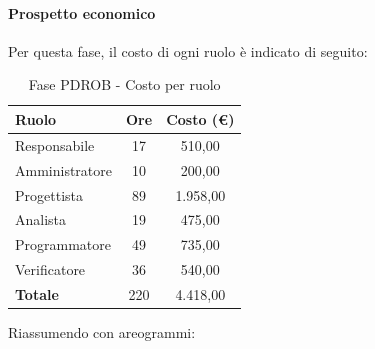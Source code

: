 \documentclass[../PianoProgetto.tex]{subfiles}
\begin{document}
	\paragraph{Prospetto economico}
					Per questa fase, il costo di ogni ruolo è indicato di seguito:
	\begin{table}[h]
		\centering
	
		\begin{tabular}{l * {2}{c}}
			\toprule
			\textbf{Ruolo} & \textbf{Ore} & \textbf{Costo (\euro{})} \\
			\midrule
			Responsabile &	17 & 510,00 \\
			Amministratore & 10 & 200,00 \\
			Progettista & 89 & 1.958,00 \\
			Analista & 19 & 475,00 \\
			Programmatore & 49 & 735,00 \\
			Verificatore & 36 & 540,00 \\
			\midrule		
			\textbf{Totale} & 220 & 4.418,00 \\
			\bottomrule	
		\end{tabular}
		\caption{Fase PDROB - Costo per ruolo}
		\label{tab:fasePDROB_costo}
	\end{table}
\vfill	
\newpage
\vfill
	Riassumendo con areogrammi:
\end{document}
